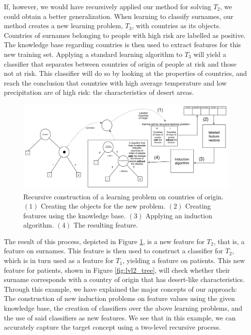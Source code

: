 \documentclass[twoside,11pt]{article}
\theoremstyle{definition}
\begin{document}
If, however, we would have recursively applied our method for solving $T_2$, we could obtain a better generalization.
When learning to classify surnames, our method creates a new learning problem, $T_3$, with countries as its objects. Countries of surnames belonging to people with high risk are labelled as positive. The knowledge base regarding countries is then used to extract features for this new training set.
Applying a standard learning algorithm to $T_3$ will yield a classifier that separates between countries of origin of people at risk and those not at risk. This classifier will do so by looking at the properties of countries, and reach the conclusion that countries with high average temperature and low precipitation are of high risk: the characteristics of desert areas. 

\begin{figure}[th]
	\centering
	\includegraphics[width=0.9\linewidth,height=0.33\linewidth]{fig4_annotated.pdf}
	\caption{Recursive construction of a learning problem on countries of origin. $(1)$ Creating the objects for the new problem. $(2)$ Creating features using the knowledge base. $(3)$ Applying an induction algorithm. $(4)$ The resulting feature.}
	\label{fig:moving_to_lvl2}
\end{figure}

 The result of this process, depicted in Figure \ref{fig:moving_to_lvl2}, is a new feature for $T_2$, that is, a feature on surnames. This feature is then used to construct a classifier for $T_2$, which is in turn used as a feature for $T_1$, yielding a feature on patients. This new feature for patients, shown in Figure \ref{fig:lvl2_tree}, will check whether their surname corresponds with a country of origin that has desert-like characteristics. 
 Through this example, we have explained the major concepts of our approach: The construction of new induction problems on feature values using the given knowledge base, the creation of classifiers over the above learning problems, and the use of said classifiers as new features. We see that in this example, we can accurately capture the target concept using a two-level recursive process.
 
\end{document}
